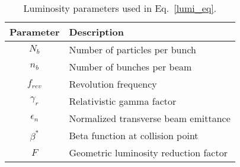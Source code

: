 \begin{table}
\noindent \centering{}
\caption{Luminosity parameters used in Eq.~\eqref{lumi_eq}.}
\label{lumi_params}
\begin{tabular}{cl}
\hline
Parameter & Description\\
\hline
$N_{b}$ & Number of particles per bunch\\
$n_{b}$ & Number of bunches per beam\\
$f_{rev}$ & Revolution frequency\\
$\gamma_{r}$ & Relativistic gamma factor\\
$\epsilon_{n}$ & Normalized transverse beam emittance\\
$\beta^{*}$ & Beta function at collision point\\
$F$ & Geometric luminosity reduction factor\\
\hline
\end{tabular}
\end{table}
